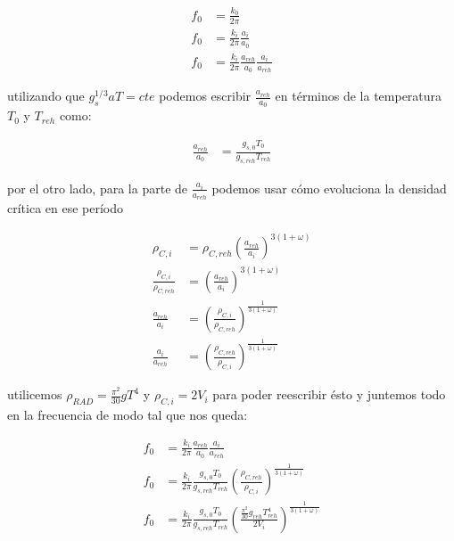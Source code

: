 \begin{equation*}
    \begin{split}
        f_0 &= \frac{k_0}{2 \pi}\\
        f_0 &= \frac{k_i}{2 \pi} \frac{a_i}{a_0}\\
        f_0 &= \frac{k_i}{2 \pi} \frac{a_{reh}}{a_{0}} \frac{a_i}{a_{reh}}
    \end{split}
\end{equation*}

\noindent
utilizando que $g^{1/3}_s a T = cte$ podemos escribir $\frac{a_{reh}}{a_0}$ en términos de la temperatura $T_0$ y $T_{reh}$ como:

\begin{equation*}
    \begin{split}
        \frac{a_{reh}}{a_0} &= \frac{g_{s,0} T_0}{g_{s,reh} T_{reh}}
    \end{split}
\end{equation*}

\noindent
por el otro lado, para la parte de $\frac{a_i}{a_{reh}}$ podemos usar cómo evoluciona la densidad crítica en ese período

\begin{equation*}
    \begin{split}
        \rho_{C,i} &= \rho_{C,reh} \left( \frac{a_{reh}}{a_i} \right)^{3(1 + \omega)}\\
        \frac{\rho_{C,i}}{\rho_{C,reh}} &= \left( \frac{a_{reh}}{a_i} \right)^{3(1 + \omega)}\\
        \frac{a_{reh}}{a_i} &= \left( \frac{\rho_{C,i}}{\rho_{C,reh}} \right)^{\frac{1}{3(1 + \omega)}}\\
        \frac{a_{i}}{a_{reh}} &= \left( \frac{\rho_{C,reh}}{\rho_{C,i}} \right)^{\frac{1}{3(1 + \omega)}}
    \end{split}
\end{equation*}

\noindent
utilicemos $\rho_{RAD} = \frac{\pi^2}{30} g T^4$ y $\rho_{C,i} = 2 V_i$ para poder reescribir ésto y juntemos todo en la frecuencia de modo tal que nos queda:

\begin{equation*}
    \begin{split}
        f_0 &= \frac{k_i}{2 \pi} \frac{a_{reh}}{a_{0}} \frac{a_i}{a_{reh}}\\
        f_0 &= \frac{k_i}{2 \pi} \frac{g_{s,0} T_0}{g_{s,reh} T_{reh}} \left( \frac{\rho_{C,reh}}{\rho_{C,i}} \right)^{\frac{1}{3(1 + \omega)}}\\
        f_0 &= \frac{k_i}{2 \pi} \frac{g_{s,0} T_0}{g_{s,reh} T_{reh}} \left( \frac{\frac{\pi^2}{30} g_{reh} T^4_{reh}}{2V_{i}} \right)^{\frac{1}{3(1 + \omega)}}
    \end{split}
\end{equation*}

